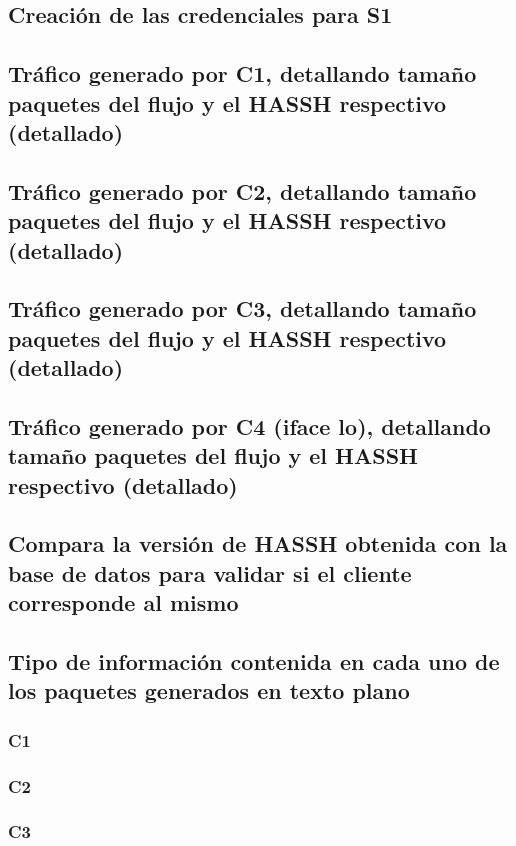 \documentclass[letter,12pt]{article}
\begin{document}
\subsection{Creación de las credenciales para S1}

\subsection{Tráfico generado por C1, detallando tamaño paquetes del flujo y el HASSH respectivo (detallado)}

\subsection{Tráfico generado por C2, detallando tamaño paquetes del flujo y el HASSH respectivo (detallado)}

\subsection{Tráfico generado por C3, detallando tamaño paquetes del flujo y el HASSH respectivo (detallado)}

\subsection{Tráfico generado por C4 (iface lo), detallando tamaño paquetes del flujo y el HASSH respectivo (detallado)}

\subsection{Compara la versión de HASSH obtenida con la base de datos para validar si el cliente corresponde al mismo}

\subsection{Tipo de información contenida en cada uno de los paquetes generados en texto plano}
\subsubsection{C1}
\subsubsection{C2}
\subsubsection{C3}
\end{document}
